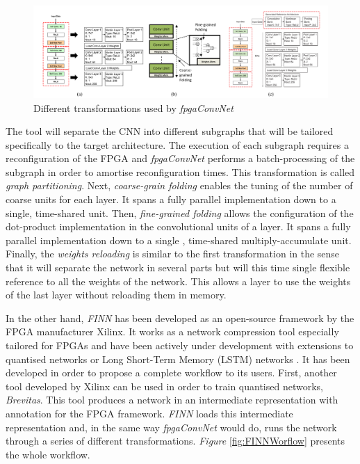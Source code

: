 \begin{figure}[htbp]
	\centering
		\includegraphics[width=\textwidth]{Figures/fpgaConvNetTransformations.png}
	\caption[Inference Optimisations]{Different transformations used by \emph{fpgaConvNet} \cite{Venieris2017}}
	\label{fig:fpgaConvNetTransformations}
\end{figure}


The tool will separate the CNN into different subgraphs that will be tailored specifically to the target architecture. The execution of each subgraph requires a reconfiguration of the FPGA and \emph{fpgaConvNet} performs a batch-processing of the subgraph in order to amortise reconfiguration times. This transformation is called \emph{graph partitioning}. Next, \emph{coarse-grain folding} enables the tuning of the number of coarse units for each layer. It spans a fully parallel implementation down to a single, time-shared unit. Then, \emph{fine-grained folding} allows the configuration of the dot-product implementation in the convolutional units of a layer. It spans a fully parallel implementation down to a single , time-shared multiply-accumulate unit. Finally, the \emph{weights reloading} is similar to the first transformation in the sense that it will separate the network in several parts but will this time single flexible reference to all the weights of the network. This allows a layer to use the weights of the last layer without reloading them in memory.

In the other hand, \emph{FINN} \cite{Umuroglu2017a} has been developed as an open-source framework by the FPGA manufacturer Xilinx. It works as a network compression tool especially tailored for FPGAs and have been actively under development with extensions to quantised networks \cite{Blott2018} or Long Short-Term Memory (LSTM) networks \cite{Rybalkin2018}. It has been developed in order to propose a complete workflow to its users. First, another tool developed by Xilinx can be used in order to train quantised networks, \emph{Brevitas}. This tool produces a network in an intermediate representation with annotation for the FPGA framework. \emph{FINN} loads this intermediate representation and, in the same way \emph{fpgaConvNet} would do, runs the network through a series of different transformations. \emph{Figure} \ref{fig:FINNWorflow} presents the whole workflow.


